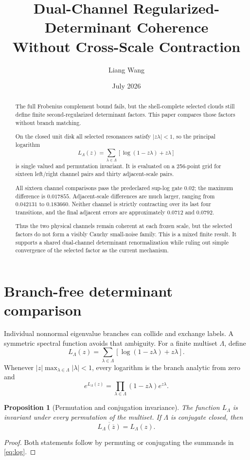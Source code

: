 \documentclass[11pt]{article}
\title{Dual-Channel Regularized-Determinant Coherence\\
\large Without Cross-Scale Contraction}
\author{Liang Wang}
\date{July 2026}
\newtheorem{proposition}[theorem]{Proposition}
\theoremstyle{remark}\newtheorem{remark}[theorem]{Remark}
\begin{document}
\maketitle

\begin{abstract}
The full Frobenius complement bound fails, but the shell-complete selected
clouds still define finite second-regularized determinant factors. This paper
compares those factors without branch matching.

On the closed unit disk all selected resonances satisfy $|z\lambda|<1$, so
the principal logarithm
\[
 L_\Lambda(z)=
 \sum_{\lambda\in\Lambda}
 [\log(1-z\lambda)+z\lambda]
\]
is single valued and permutation invariant. It is evaluated on a 256-point
grid for sixteen left/right channel pairs and thirty adjacent-scale pairs.

All sixteen channel comparisons pass the predeclared sup-log gate $0.02$; the
maximum difference is $0.017855$. Adjacent-scale differences are much larger,
ranging from $0.042131$ to $0.183660$. Neither channel is strictly
contracting over its last four transitions, and the final adjacent errors are
approximately $0.0712$ and $0.0792$.

Thus the two physical channels remain coherent at each frozen scale, but the
selected factors do not form a visibly Cauchy small-noise family. This is a
mixed finite result. It supports a shared dual-channel determinant
renormalization while ruling out simple convergence of the selected factor as
the current mechanism.
\end{abstract}

\section{Branch-free determinant comparison}

Individual nonnormal eigenvalue branches can collide and exchange labels.
A symmetric spectral function avoids that ambiguity. For a finite multiset
$\Lambda$, define
\begin{equation}\label{eq:log}
 L_\Lambda(z)=
 \sum_{\lambda\in\Lambda}
 [\log(1-z\lambda)+z\lambda].
\end{equation}
Whenever $|z|\max_{\lambda\in\Lambda}|\lambda|<1$, every logarithm is the
branch analytic from zero and
\[
 e^{L_\Lambda(z)}
 =\prod_{\lambda\in\Lambda}(1-z\lambda)e^{z\lambda}.
\]

\begin{proposition}[Permutation and conjugation invariance]
\label{prop:symmetry}
The function $L_\Lambda$ is invariant under every permutation of the
multiset. If $\Lambda$ is conjugate closed, then
\[
 \overline{L_\Lambda(\overline z)}=L_\Lambda(z).
\]
\end{proposition}
\begin{proof}
Both statements follow by permuting or conjugating the summands in
\eqref{eq:log}.
\end{proof}
\end{document}

